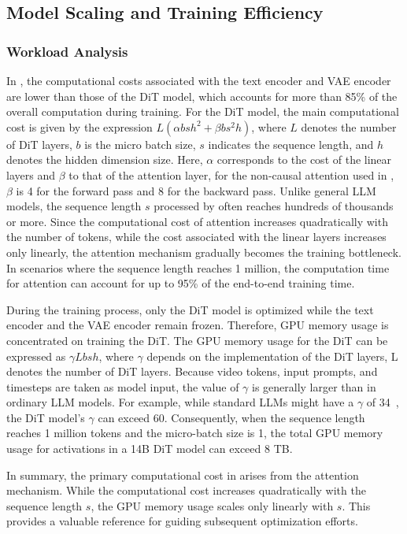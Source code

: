 \subsection{Model Scaling and Training Efficiency}
\label{sec:train}


\subsubsection{Workload Analysis}

In \method, the computational costs associated with the text encoder and VAE encoder are lower than those of the DiT model, which accounts for more than 85\% of the overall computation during training. For the DiT model, the main computational cost is given by the expression $L(\alpha bsh^2+\beta bs^2h)$, where $L$ denotes the number of DiT layers, $b$ is the micro batch size, $s$ indicates the sequence length, and $h$ denotes the hidden dimension size. Here, $\alpha$ corresponds to the cost of the linear layers and $\beta$ to that of the attention layer, for the non-causal attention used in \method, $\beta$ is 4 for the forward pass and 8 for the backward pass. Unlike general LLM models, the sequence length $s$ processed by \method often reaches hundreds of thousands or more. Since the computational cost of attention increases quadratically with the number of tokens, while the cost associated with the linear layers increases only linearly, the attention mechanism gradually becomes the training bottleneck. In scenarios where the sequence length reaches 1 million, the computation time for attention can account for up to 95\% of the end-to-end training time.


During the training process, only the DiT model is optimized while the text encoder and the VAE encoder remain frozen. Therefore, GPU memory usage is concentrated on training the DiT. The GPU memory usage for the DiT can be expressed as $\gamma Lbsh$, where $\gamma$ depends on the implementation of the DiT layers, L denotes the number of DiT layers. Because video tokens, input prompts, and timesteps are taken as model input, the value of $\gamma$ is generally larger than in ordinary LLM models. For example, while standard LLMs might have a $\gamma$ of 34~\citep{korthikanti2022megatronsp}, the DiT model's $\gamma$ can exceed 60.
Consequently, when the sequence length reaches 1 million tokens and the micro-batch size is 1, the total GPU memory usage for activations in a 14B DiT model can exceed 8 TB.

In summary, the primary computational cost in \method arises from the attention mechanism.
While the computational cost increases quadratically with the sequence length $s$, the GPU memory usage scales only linearly with $s$. This provides a valuable reference for guiding subsequent optimization efforts.


